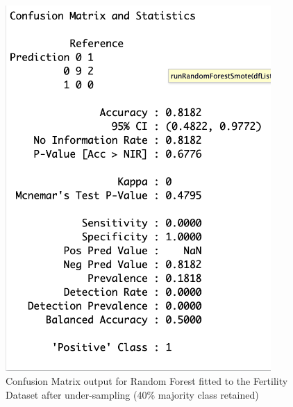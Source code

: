 \begin{figure}[!htbp]
    \centering
    \begin{minipage}{0.45\textwidth}
        \centering
        \includegraphics[width=0.9\textwidth]{ThesisTemplate/appendix/images/Chapter5Appendix/ConfusionMatrix40/Fertility.png}
        \caption{Confusion Matrix output for Random Forest fitted to the Fertility Dataset after under-sampling (40\% majority class retained)}
        \label{fig:matrixFert40}
    \end{minipage}\hfill
    \begin{minipage}{0.45\textwidth}
        \centering

\end{minipage}
\end{figure}
